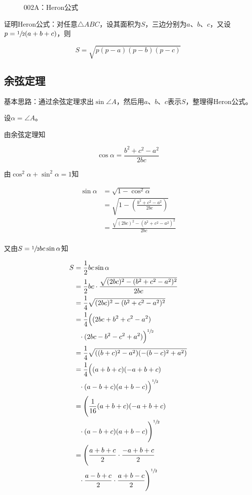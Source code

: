 

\begin{figure}[htbp]
  \centering
  \caption{002A：Heron公式} \label{fig:002A}
\end{figure}

证明Heron公式：对任意$\triangle ABC$，设其面积为$S$，三边分别为$a$、$b$、$c$，又设$p = \sfrac12(a + b + c)$，则

\[ S = \sqrt{p(p - a)(p - b)(p - c)} \]

\subsection{余弦定理}

基本思路：通过余弦定理求出$\sin\angle A$，然后用$a$、$b$、$c$表示$S$，整理得Heron公式。

设$\alpha = \angle A$。

由余弦定理知

\[ \cos\alpha = \frac{b^2 + c^2 - a^2}{2bc} \]

由$\cos^2\alpha + \sin^2\alpha = 1$知

\begin{align*}
  \sin\alpha &= \sqrt{1 - \cos^2\alpha} \\
  &= \sqrt{1 - \left(\frac{b^2 + c^2 - a^2}{2bc}\right)} \\
  &= \frac{\sqrt{(2bc)^2 - (b^2 + c^2 - a^2)^2}}{2bc} \\
\end{align*}

又由$S = \sfrac12bc\sin\alpha$知

\begin{align*}
  S &= \frac12bc\sin\alpha \\
  &= \frac12bc\cdot\frac{\sqrt{(2bc)^2 - (b^2 + c^2 - a^2)^2}}{2bc} \\
  &= \frac14\sqrt{(2bc)^2 - (b^2 + c^2 - a^2)^2} \\
  &= \frac14\Big((2bc + b^2 + c^2 - a^2) \\
  &\phantom{=} \cdot(2bc - b^2 - c^2 + a^2)\Big)^{\sfrac12} \\
  &= \frac14\sqrt{((b + c)^2 - a^2)(-(b - c)^2 + a^2)} \\
  &= \frac14\Big((a + b + c)(-a + b + c) \\
  &\phantom{=} \cdot(a - b + c)(a + b - c)\Big)^{\sfrac12} \\
  &= \Bigg(\frac1{16}(a + b + c)(-a + b + c) \\
  &\phantom{=} \cdot(a - b + c)(a + b - c)\Bigg)^{\sfrac12} \\
  &= \Bigg(\frac{a + b + c}2\cdot\frac{-a + b + c}2 \\
  &\phantom{=} \cdot\frac{a - b + c}2\cdot\frac{a + b - c}2\Bigg)^{\sfrac12} \\
\end{align*}

